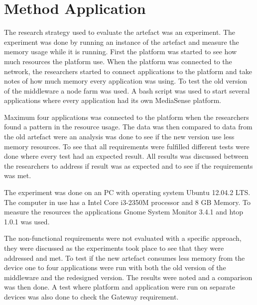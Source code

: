 \section{Method Application}
The research strategy used to evaluate the artefact was an experiment. The experiment was done by running an instance of the artefact and measure the memory usage while it is running. First the platform was started to see how much resources the platform use. When the platform was connected to the network, the researchers started to connect applications to the platform and take notes of how much memory every application was using. To test the old version of the middleware a node farm was used. A bash script was used to start several applications where every application had its own MediaSense platform. 

Maximum four applications was connected to the platform when the researchers found a pattern in the resource usage. The data was then compared to data from the old artefact were an analysis was done to see if the new version use less memory resources. To see that all requirements were fulfilled different tests were done where every test had an expected result. All results was discussed between the researchers to address if result was as expected and to see if the requirements was met. 

The experiment was done on an PC with operating system Ubuntu 12.04.2 LTS. The computer in use has a Intel Core i3-2350M processor and 8 GB Memory. To measure the resources the applications Gnome System Monitor 3.4.1 \cite{gnomesm} and htop 1.0.1 \cite{htop} was used. 

The non-functional requirements were not evaluated with a specific approach, they were discussed as the experiments took place to see that they were addressed and met. To test if the new artefact consumes less memory from the device one to four applications were run with both the old version of the middleware and the redesigned version. The results were noted and a comparison was then done. A test where platform and application were run on separate devices was also done to check the Gateway requirement.
